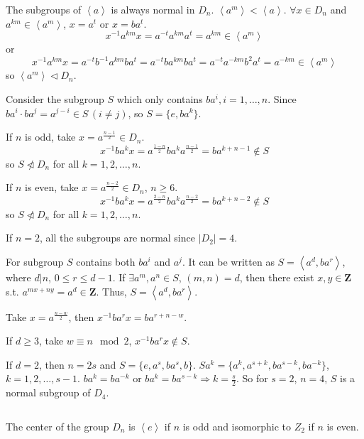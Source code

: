 \begin{answer}
    The subgroups of $\left\langle a\right\rangle$ is always normal in $D_{n}$. $\left\langle a^{m}\right\rangle <\left\langle a\right\rangle$. $\forall x\in D_{n}$ and $a^{km}\in \left\langle a^{m}\right\rangle$, $x=a^{t}$ or $x=ba^{t}$. \[x^{-1}a^{km}x=a^{-t}a^{km}a^{t}=a^{km}\in\left\langle a^{m}\right\rangle\] or \[x^{-1}a^{km}x=a^{-t}b^{-1}a^{km}ba^{t}=a^{-t}ba^{km}ba^{t}=a^{-t}a^{-km}b^{2}a^{t}=a^{-km}\in \left\langle a^{m}\right\rangle\] so $\left\langle a^{m}\right\rangle \lhd D_{n}$.

    Consider the subgroup $S$ which only contains $ba^{i}, i=1,\dots, n$. Since $ba^{i}\cdot ba^{j}=a^{j-i}\in S\,(i\neq j)$, so $S=\{e, ba^{k}\}$.

    If $n$ is odd, take $x=a^{\frac{n-1}{2}}\in D_{n}$. \[x^{-1}ba^{k}x=a^{\frac{1-n}{2}}ba^{k}a^{\frac{n-1}{2}}=ba^{k+n-1}\notin S\] so $S\ntriangleleft D_{n}$ for all $k=1,2,\dots,n$.

    If $n$ is even, take $x=a^{\frac{n-2}{2}}\in D_{n}$, $n\geq 6$. \[x^{-1}ba^{k}x=a^{\frac{2-n}{2}}ba^{k}a^{\frac{n-2}{2}}=ba^{k+n-2}\notin S\] so $S\ntriangleleft D_{n}$ for all $k=1,2,\dots,n$.

     If $n=2$, all the subgroups are normal since $\left| D_{2} \right| =4$.

     For subgroup $S$ contains both $ba^{i}$ and $a^{j}$. It can be written as $S=\left\langle a^{d}, ba^{r}\right\rangle$, where $d|n$, $0\leq r\leq d-1$. If $\exists a^{m}, a^{n}\in S$, $(m,n)=d$, then there exist $x,y\in \mathbf{Z}$ s.t. $a^{mx+ny}=a^{d}\in \mathbf{Z}$. Thus, $S=\left\langle a^{d},ba^{r}\right\rangle$.

     Take $x=a^{\frac{n-w}{2}}$, then $x^{-1}ba^{r}x=ba^{r+n-w}$.
     
     If $d\geq 3$, take $w\equiv n\mod 2$, $x^{-1}ba^{r}x\notin S$.

     If $d=2$, then $n=2s$ and $S=\{e, a^{s}, ba^{s}, b\}$. $Sa^{k}=\{a^{k}, a^{s+k},ba^{s-k}, ba^{-k}\}$, $k=1,2,\dots, s-1$. $ba^{k}=ba^{-k}$ or $ba^{k}=ba^{s-k}\Rightarrow k=\frac{s}{2}$. So for $s=2$, $n=4$, $S$ is a normal subgroup of $D_{4}$.
\end{answer}

$$ $$

\begin{ex}
    The center of the group $D_{n}$ is $\left\langle e\right\rangle$ if $n$ is odd and isomorphic to $Z_{2}$ if $n$ is even.
\end{ex}


